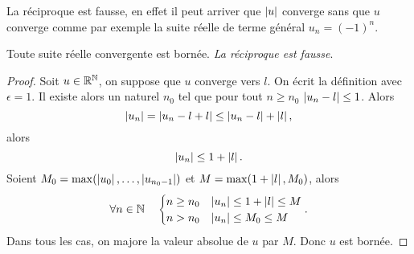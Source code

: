 La réciproque est fausse, en effet il peut arriver que $\left\lvert u\right\rvert$ converge sans que $u$ converge comme par exemple la suite réelle de terme général $u_n=(-1)^n$.
\begin{prop}
  Toute suite réelle convergente est bornée. \emph{La réciproque est fausse}.
\end{prop}
\begin{proof}
  Soit $u\in \mathbb{R}^{\mathbb{N}}$, on suppose que $u$ converge vers $l$. On écrit la définition avec $\epsilon=1$. Il existe alors un naturel $n_0$ tel que pour tout $n\geq n_0$ $\left\lvert u_n-l\right\rvert\leq 1$. Alors
  \begin{equation}
    \left\lvert u_n\right\rvert=\left\lvert u_n-l+l\right\rvert\leq \left\lvert u_n-l\right\rvert+\left\lvert l\right\rvert,
  \end{equation}
  alors
  \begin{equation}
    \left\lvert u_n\right\rvert\leq 1+\left\lvert l\right\rvert.
  \end{equation}
  Soient $M_0=\max(\left\lvert u_0\right\rvert,\ldots,\left\lvert u_{n_0-1}\right\rvert)$ et $M=\max(1+\left\lvert l\right\rvert,M_0)$, alors
  \begin{equation}
    \forall n \in \mathbb{N} \quad
    \begin{cases}
      n \geq n_0 & \left\lvert u_n\right\rvert\leq 1+\left\lvert l\right\rvert\leq M \\
      n>n_0 & \left\lvert u_n\right\rvert\leq M_0\leq M
    \end{cases}.
  \end{equation}
  Dans tous les cas, on majore la valeur absolue de $u$ par $M$. Donc $u$ est bornée.
\end{proof}

